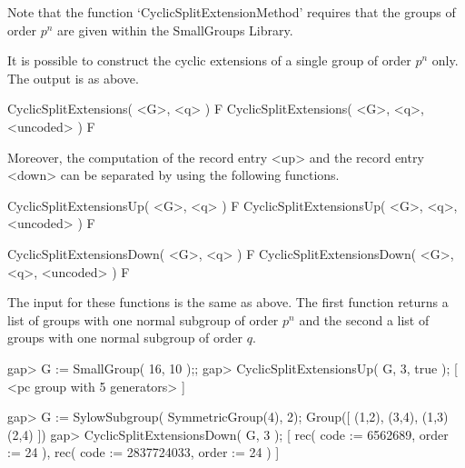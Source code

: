 Note that the function `CyclicSplitExtensionMethod' requires that
the groups of order $p^n$ are given within the SmallGroups Library. 


It is possible to construct the cyclic extensions of a single group
of order $p^n$ only. The output is as above.

\>CyclicSplitExtensions( <G>, <q> ) F
\>CyclicSplitExtensions( <G>, <q>, <uncoded> ) F

Moreover, the computation of the record entry <up> and the record
entry <down> can be separated by using the following functions.

\> CyclicSplitExtensionsUp( <G>, <q> ) F
\> CyclicSplitExtensionsUp( <G>, <q>, <uncoded> ) F

\> CyclicSplitExtensionsDown( <G>, <q> ) F
\> CyclicSplitExtensionsDown( <G>, <q>, <uncoded> ) F

The input for these functions is the same as above. The first
function returns a list of groups with one normal subgroup of order
$p^n$ and the second a list of groups with one normal subgroup of order
$q$. 

\beginexample
gap> G := SmallGroup( 16, 10 );;
gap> CyclicSplitExtensionsUp( G, 3, true );
[ <pc group with 5 generators> ]

gap> G := SylowSubgroup( SymmetricGroup(4), 2);
Group([ (1,2), (3,4), (1,3)(2,4) ])
gap> CyclicSplitExtensionsDown( G, 3 );
[ rec( code := 6562689, order := 24 ), 
  rec( code := 2837724033, order := 24 ) ]
\endexample
